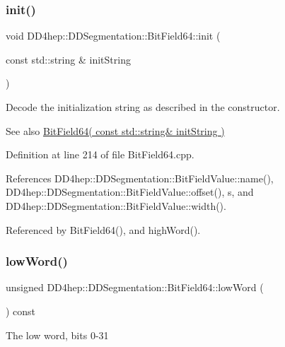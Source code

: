 \subsubsection{\texorpdfstring{init()}{init()}}
{\footnotesize\ttfamily void D\+D4hep\+::\+D\+D\+Segmentation\+::\+Bit\+Field64\+::init (\begin{DoxyParamCaption}\item[{const std\+::string \&}]{init\+String }\end{DoxyParamCaption})\hspace{0.3cm}{\ttfamily [protected]}}

Decode the initialization string as described in the constructor. \begin{DoxySeeAlso}{See also}
\hyperlink{class_d_d4hep_1_1_d_d_segmentation_1_1_bit_field64_aa958402b4d1f8d79cf716397b9b642e4}{Bit\+Field64( const std\+::string\& init\+String )} 
\end{DoxySeeAlso}


Definition at line 214 of file Bit\+Field64.\+cpp.



References D\+D4hep\+::\+D\+D\+Segmentation\+::\+Bit\+Field\+Value\+::name(), D\+D4hep\+::\+D\+D\+Segmentation\+::\+Bit\+Field\+Value\+::offset(), s, and D\+D4hep\+::\+D\+D\+Segmentation\+::\+Bit\+Field\+Value\+::width().



Referenced by Bit\+Field64(), and high\+Word().

\hypertarget{class_d_d4hep_1_1_d_d_segmentation_1_1_bit_field64_aedf921c57b38c91aa85b946cf1a70818}{}\label{class_d_d4hep_1_1_d_d_segmentation_1_1_bit_field64_aedf921c57b38c91aa85b946cf1a70818} 
\subsubsection{\texorpdfstring{low\+Word()}{lowWord()}}
{\footnotesize\ttfamily unsigned D\+D4hep\+::\+D\+D\+Segmentation\+::\+Bit\+Field64\+::low\+Word (\begin{DoxyParamCaption}{ }\end{DoxyParamCaption}) const\hspace{0.3cm}{\ttfamily [inline]}}

The low word, bits 0-\/31 

